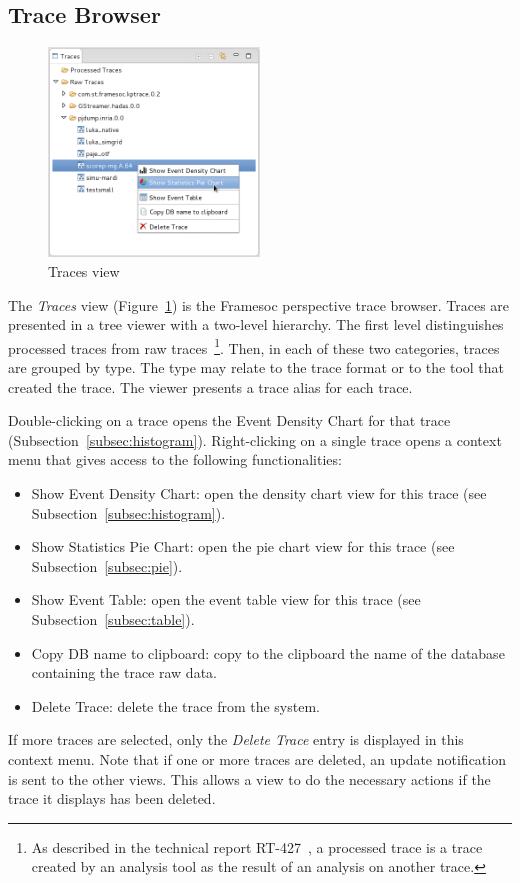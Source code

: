 \documentclass[twoside]{article}
\begin{document}
\begin{sloppypar}
\subsection{Trace Browser}
\label{subsec:explorer}

\begin{figure}[h!]
  \centering
    \includegraphics[width=0.5\textwidth]{images/popup_explorer.png}
  \caption{Traces view}
  \label{fig:popup_explorer}
\end{figure}

The \emph{Traces} view (Figure~\ref{fig:popup_explorer}) is the Framesoc perspective trace browser.
Traces are presented in a tree viewer with a two-level hierarchy. 
The first level distinguishes processed traces from raw traces~\footnote{As described in the technical report RT-427~\cite{pagano:hal}, a processed trace is a trace created by an analysis tool as the result of an analysis on another trace.}. 
Then, in each of these two categories, traces are grouped by type. 
The type may relate to the trace format or to the tool that created the trace. 
The viewer presents a trace alias for each trace.

Double-clicking on a trace opens the Event Density Chart for that trace (Subsection~\ref{subsec:histogram}).
Right-clicking on a single trace opens a context menu that gives access to the following functionalities:
\begin{itemize}
 \item Show Event Density Chart: open the density chart view for this trace (see Subsection~\ref{subsec:histogram}).
 \item Show Statistics Pie Chart: open the pie chart view for this trace (see Subsection~\ref{subsec:pie}).
 \item Show Event Table: open the event table view for this trace (see Subsection~\ref{subsec:table}).
 \item Copy DB name to clipboard: copy to the clipboard the name of the database containing the trace raw data.
 \item Delete Trace: delete the trace from the system.
\end{itemize}
If more traces are selected, only the \emph{Delete Trace} entry is displayed in this context menu.
Note that if one or more traces are deleted, an update notification is sent to the other views.
This allows a view to do the necessary actions if the trace it displays has been deleted.


\end{sloppypar}
\end{document}
